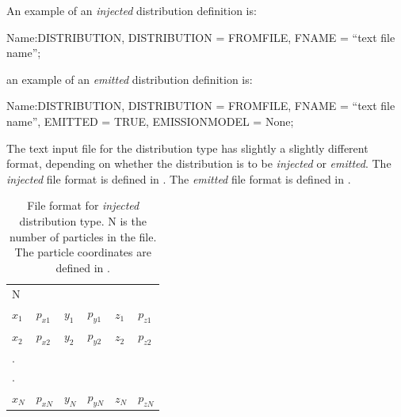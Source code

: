 An example of an \emph{injected}  distribution definition is:

\begin{example}
Name:DISTRIBUTION, DISTRIBUTION = FROMFILE,
                   FNAME = ``text file name'';
\end{example}
an example of an \emph{emitted}  distribution definition is:

\begin{example}
Name:DISTRIBUTION, DISTRIBUTION = FROMFILE,
                   FNAME = ``text file name'',
                   EMITTED = TRUE,
                   EMISSIONMODEL = None;
\end{example}

The text input file for the  distribution type has slightly a slightly different
format, depending on whether the distribution is to be \emph{injected} or \emph{emitted}. The
\emph{injected} file format is defined in . The \emph{emitted}
file format is defined in .

\begin{table}[!htb]
  \begin{center}\footnotesize
    \caption{File format for \emph{injected}  distribution type. N is the number
    of particles in the file. The particle coordinates are defined in .}
    \label{tab:fromfileinjfileformat}
    \begin{tabular}{llllll}
      \hline
      N & & & & & \\
      $x_{1}$ & $p_{x1}$ & $y_{1}$ & $p_{y1}$ & $z_{1}$ & $p_{z1}$ \\
      $x_{2}$ & $p_{x2}$ & $y_{2}$ & $p_{y2}$ & $z_{2}$ & $p_{z2}$ \\
      . & & & & & \\
      . & & & & & \\
      $x_{N}$ & $p_{xN}$ & $y_{N}$ & $p_{yN}$ & $z_{N}$ & $p_{zN}$ \\
      \hline
    \end{tabular}
  \end{center}
\end{table}


